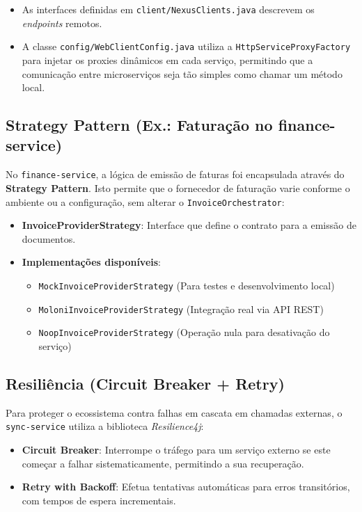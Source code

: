 \begin{itemize}[itemsep=0.4em]
  \item As interfaces definidas em \texttt{client/NexusClients.java} descrevem os \textit{endpoints} remotos.
  \item A classe \texttt{config/WebClientConfig.java} utiliza a \texttt{HttpServiceProxyFactory} para injetar os proxies dinâmicos em cada serviço, permitindo que a comunicação entre microserviços seja tão simples como chamar um método local.
\end{itemize}

\medskip

\subsection{Strategy Pattern (Ex.: Faturação no finance-service)}
No \texttt{finance-service}, a lógica de emissão de faturas foi encapsulada através do \textbf{Strategy Pattern}. Isto permite que o fornecedor de faturação varie conforme o ambiente ou a configuração, sem alterar o \texttt{InvoiceOrchestrator}:

\begin{itemize}[itemsep=0.4em]
  \item \textbf{InvoiceProviderStrategy}: Interface que define o contrato para a emissão de documentos.
  \item \textbf{Implementações disponíveis}:
    \begin{itemize}[label=$\circ$, itemsep=0.2em, topsep=0.2em]
      \item \texttt{MockInvoiceProviderStrategy} (Para testes e desenvolvimento local)
      \item \texttt{MoloniInvoiceProviderStrategy} (Integração real via API REST)
      \item \texttt{NoopInvoiceProviderStrategy} (Operação nula para desativação do serviço)
    \end{itemize}
\end{itemize}

\medskip

\subsection{Resiliência (Circuit Breaker + Retry)}
Para proteger o ecossistema contra falhas em cascata em chamadas externas, o \texttt{sync-service} utiliza a biblioteca \textit{Resilience4j}:

\begin{itemize}[itemsep=0.4em]
  \item \textbf{Circuit Breaker}: Interrompe o tráfego para um serviço externo se este começar a falhar sistematicamente, permitindo a sua recuperação.
  \item \textbf{Retry with Backoff}: Efetua tentativas automáticas para erros transitórios, com tempos de espera incrementais.
\end{itemize}

